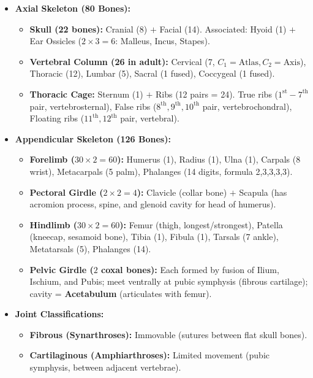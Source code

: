 \documentclass[10pt,a4paper]{article}
\begin{document}
\begin{conceptbox}
\begin{itemize}
  \item \textbf{Axial Skeleton (80 Bones):}
  \begin{itemize}
    \item \textbf{Skull (22 bones):} Cranial (8) $+$ Facial (14). Associated: Hyoid (1) $+$ Ear Ossicles ($2 \times 3 = 6$: Malleus, Incus, Stapes).
    \item \textbf{Vertebral Column (26 in adult):} Cervical (7, $C_1=\text{Atlas}, C_2=\text{Axis}$), Thoracic (12), Lumbar (5), Sacral (1 fused), Coccygeal (1 fused).
    \item \textbf{Thoracic Cage:} Sternum (1) $+$ Ribs (12 pairs = 24). True ribs ($1^{\mathrm{st}}-7^{\mathrm{th}}$ pair, vertebrosternal), False ribs ($8^{\mathrm{th}}, 9^{\mathrm{th}}, 10^{\mathrm{th}}$ pair, vertebrochondral), Floating ribs ($11^{\mathrm{th}}, 12^{\mathrm{th}}$ pair, vertebral).
  \end{itemize}
  \item \textbf{Appendicular Skeleton (126 Bones):}
  \begin{itemize}
    \item \textbf{Forelimb ($30 \times 2 = 60$):} Humerus (1), Radius (1), Ulna (1), Carpals (8 wrist), Metacarpals (5 palm), Phalanges (14 digits, formula 2,3,3,3,3).
    \item \textbf{Pectoral Girdle ($2 \times 2 = 4$):} Clavicle (collar bone) $+$ Scapula (has acromion process, spine, and glenoid cavity for head of humerus).
    \item \textbf{Hindlimb ($30 \times 2 = 60$):} Femur (thigh, longest/strongest), Patella (kneecap, sesamoid bone), Tibia (1), Fibula (1), Tarsals (7 ankle), Metatarsals (5), Phalanges (14).
    \item \textbf{Pelvic Girdle ($2$ coxal bones):} Each formed by fusion of Ilium, Ischium, and Pubis; meet ventrally at pubic symphysis (fibrous cartilage); cavity = \textbf{Acetabulum} (articulates with femur).
  \end{itemize}
  \item \textbf{Joint Classifications:}
  \begin{itemize}
    \item \textbf{Fibrous (Synarthroses):} Immovable (sutures between flat skull bones).
    \item \textbf{Cartilaginous (Amphiarthroses):} Limited movement (pubic symphysis, between adjacent vertebrae).

\end{itemize}
\end{itemize}
\end{conceptbox}
\end{document}
